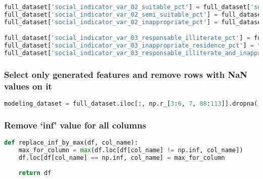 \begin{lstlisting}[language=Python]
full_dataset['social_indicator_var_02_suitable_pct'] = full_dataset['social_indicator_var_02_2000_suitable'] / full_dataset['social_indicator_var_02_2010_suitable']
full_dataset['social_indicator_var_02_semi_suitable_pct'] = full_dataset['social_indicator_var_02_2000_semi_suitable'] / full_dataset['social_indicator_var_02_2010_semi_suitable']
full_dataset['social_indicator_var_02_inappropriate_pct'] = full_dataset['social_indicator_var_02_2000_inappropriate'] / full_dataset['social_indicator_var_02_2010_inappropriate']

full_dataset['social_indicator_var_03_responsable_illiterate_pct'] = full_dataset['social_indicator_var_03_2000_responsable_illiterate'] / full_dataset['social_indicator_var_03_2010_responsable_illiterate']
full_dataset['social_indicator_var_03_inappropriate_residence_pct'] = full_dataset['social_indicator_var_03_2000_inappropriate_residence'] / full_dataset['social_indicator_var_03_2010_inappropriate_residence']
full_dataset['social_indicator_var_03_responsable_illiterate_and_inappropriate_residence_pct'] = full_dataset['social_indicator_var_03_2000_responsable_illiterate_and_inappropriate_residence'] / full_dataset['social_indicator_var_03_2010_responsable_illiterate_and_inappropriate_residence']
\end{lstlisting}

\subsubsection{Select only generated features and remove rows with NaN
values on
it}\label{select-only-generated-features-and-remove-rows-with-nan-values-on-it}

\begin{lstlisting}[language=Python]
modeling_dataset = full_dataset.iloc[:, np.r_[3:6, 7, 88:113]].dropna()
\end{lstlisting}

\subsubsection{\texorpdfstring{Remove `inf' value for all
columns}{Remove inf value for all columns}}\label{remove-inf-value-for-all-columns}

\begin{lstlisting}[language=Python]
def replace_inf_by_max(df, col_name):
    max_for_column = max(df.loc[df[col_name] != np.inf, col_name])
    df.loc[df[col_name] == np.inf, col_name] = max_for_column
    
    return df
\end{lstlisting}

